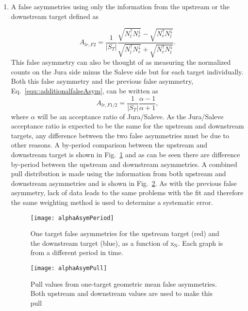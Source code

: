 \begin{enumerate}
\item A false asymmetries using only the information from the upstream or the
  downstream target defined as

  \begin{equation}
    \label{equ::falseANgeomean}
    A_{lr, F2} =
    \frac{1}{|S_T|}
    \frac{\sqrt{N_l^\uparrow N_r^\downarrow}
      - \sqrt{N_r^\uparrow N_l^\downarrow}
    }{
      \sqrt{N_l^\uparrow N_r^\downarrow}
      + \sqrt{N_r^\uparrow N_l^\downarrow}
    }.
  \end{equation}
  This false asymmetry can also be thought of as measuring the normalized counts
  on the Jura side minus the Saleve side but for each target individually.  Both
  this false asymmetry and the previous false asymmetry,
  Eq.~\ref{equ::additionalfalseAsym}, can be written as
  \begin{equation}
    A_{lr,F1/2} =
    \frac{1}{|S_T|}
    \frac{\alpha - 1}{\alpha + 1},
  \end{equation}
  where $\alpha$ will be an acceptance ratio of Jura/Saleve.  As the Jura/Saleve
  acceptance ratio is expected to be the same for the upstream and downstream
  targets, any difference between the two false asymmetries must be due to other
  reasons.  A by-period comparison between the upstream and downstream target is
  shown in Fig.~\ref{fig::alphaAsymPeriod} and as can be seen there are
  difference by-period between the upstream and downstream asymmetries.  A
  combined pull distribution is made using the information from both upstream
  and downstream asymmetries and is shown in Fig.~\ref{fig::alphaAsymPull}.  As
  with the previous false asymmetry, lack of data leads to the same problems
  with the fit and therefore the same weighting method is used to determine a
  systematic error.

  \begin{figure}[h!t]
    \centering \texttt{[image: alphaAsymPeriod]}
    \caption{One target false asymmetries for the upstream target (red) and the
      downstream target (blue), as a function of x$_{\mathrm{N}}$.  Each graph
      is from a different period in time.}
    \label{fig::alphaAsymPeriod}
  \end{figure}

  \begin{figure}[h!t]
    \centering
    \texttt{[image: alphaAsymPull]}
    \caption{Pull values from one-target geometric mean false asymmetries.  Both
      upstream and downstream values are used to make this pull}
    \label{fig::alphaAsymPull}
  \end{figure}


\end{enumerate}
